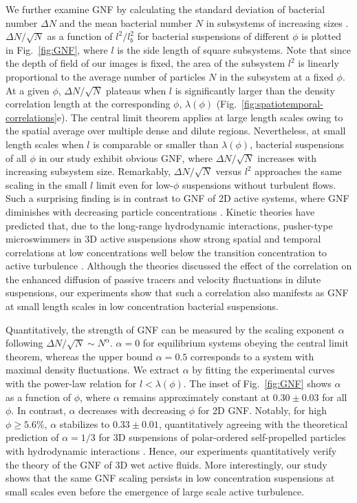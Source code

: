 \documentclass[twocolumn,aps,prx,amsmath,amssymb,longbibliography]{revtex4-2}
\begin{document}
We further examine GNF by calculating the standard deviation of bacterial number $\Delta N$ and the mean bacterial number $N$ in subsystems of increasing sizes \cite{Liu2020}. $\Delta N / \sqrt N$ as a function of $l^2/l_b^2$ for bacterial suspensions of different $\phi$ is plotted in Fig.~\ref{fig:GNF}, where $l$ is the side length of square subsystems. Note that since the depth of field of our images is fixed, the area of the subsystem $l^2$ is linearly proportional to the average number of particles $N$ in the subsystem at a fixed $\phi$. At a given $\phi$, $\Delta N/\sqrt N$ plateaus when $l$ is significantly larger than the density correlation length at the corresponding $\phi$, $\lambda(\phi)$ (Fig.~\ref{fig:spatiotemporal-correlations}e). The central limit theorem applies at large length scales owing to the spatial average over multiple dense and dilute regions. Nevertheless, at small length scales when $l$ is comparable or smaller than $\lambda(\phi)$, bacterial suspensions of all $\phi$ in our study exhibit obvious GNF, where $\Delta N/\sqrt N$ increases with increasing subsystem size. Remarkably, $\Delta N/\sqrt N$ versus $l^2$ approaches the same scaling in the small $l$ limit even for low-$\phi$ suspensions without turbulent flows. Such a surprising finding is in contrast to GNF of 2D active systems, where GNF diminishes with decreasing particle concentrations \cite{Narayan2007,Aranson2008,Kudrolli2008,Deseigne2010,Zhang2010,Schaller2013}. Kinetic theories have predicted that, due to the long-range hydrodynamic interactions, pusher-type microswimmers in 3D active suspensions show strong spatial and temporal correlations at low concentrations well below the transition concentration to active turbulence \cite{Stenhammar2017,Nambiar2021}. Although the theories discussed the effect of the correlation on the enhanced diffusion of passive tracers and velocity fluctuations in dilute suspensions, our experiments show that such a correlation also manifests as GNF at small length scales in low concentration bacterial suspensions.


Quantitatively, the strength of GNF can be measured by the scaling exponent $\alpha$ following $\Delta N/\sqrt{N} \sim N^\alpha$. $\alpha=0$ for equilibrium systems obeying the central limit theorem, whereas the upper bound $\alpha = 0.5$ corresponds to a system with maximal density fluctuations.
We extract $\alpha$ by fitting the experimental curves with the power-law relation for $l < \lambda(\phi)$. The inset of Fig.~\ref{fig:GNF} shows $\alpha$ as a function of $\phi$, where $\alpha$ remains approximately constant at $0.30 \pm 0.03$ for all $\phi$. In contrast, $\alpha$ decreases with decreasing $\phi$ for 2D GNF. Notably, for high $\phi \geq 5.6\%$, $\alpha$ stabilizes to $0.33 \pm 0.01$, quantitatively agreeing with the theoretical prediction of $\alpha = 1/3$ for 3D suspensions of polar-ordered self-propelled particles with hydrodynamic interactions \cite{AditiSimha2002}. Hence, our experiments quantitatively verify the theory of the GNF of 3D wet active fluids. More interestingly, our study shows that the same GNF scaling persists in low concentration suspensions at small scales even before the emergence of large scale active turbulence.
\end{document}
